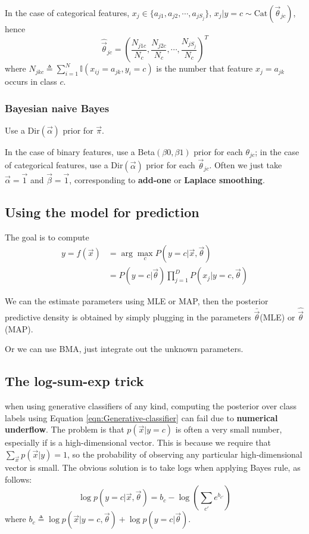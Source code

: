In the case of categorical features, $x_j \in \{a_{j1},a_{j2},\cdots, a_{jS_j}\}$, $x_j|y=c \sim \text{Cat}(\vec{\theta}_{jc})$, hence
\begin{equation}
\hat{\vec{\theta}}_{jc}=(\dfrac{N_{j1c}}{N_c},\dfrac{N_{j2c}}{N_c}, \cdots, \dfrac{N_{jS_j}}{N_c})^T
\end{equation}
where $N_{jkc} \triangleq \sum\limits_{i=1}^N \mathbb{I}(x_{ij}=a_{jk}, y_i=c)$ is the number that feature $x_j=a_{jk}$ occurs in class $c$.


\subsubsection{Bayesian naive Bayes}
\label{sec:Bayesian-naive-Bayes}
Use a Dir$(\vec{\alpha})$ prior for $\vec{\pi}$.

In the case of binary features, use a Beta$(\beta0,\beta1)$ prior for each $\theta_{jc}$; in the case of categorical features, use a Dir$(\vec{\alpha})$ prior for each  $\vec{\theta}_{jc}$. Often we just take $\vec{\alpha}=\vec{1}$ and $\vec{\beta}=\vec{1}$, corresponding to \textbf{add-one} or \textbf{Laplace smoothing}.


\subsection{Using the model for prediction}
The goal is to compute
\begin{equation}\begin{split}
y=f(\vec{x}) & =\arg\max\limits_{c}{P(y=c|\vec{x},\vec{\theta})} \\
   & =P(y=c|\vec{\theta})\prod_{j=1}^D P(x_j|y=c,\vec{\theta})
\end{split}\end{equation}

We can the estimate parameters using MLE or MAP, then the posterior predictive density is obtained by simply plugging in the parameters $\bar{\vec{\theta}}$(MLE) or $\hat{\vec{\theta}}$(MAP). 

Or we can use BMA, just integrate out the unknown parameters.


\subsection{The log-sum-exp trick}
when using generative classifiers of any kind, computing the posterior over class labels using Equation \ref{eqn:Generative-classifier} can fail due to \textbf{numerical underflow}. The problem is that $p(\vec{x}|y=c)$ is often a very small number, especially if  is a high-dimensional vector. This is because we require that $\sum_{\vec{x}}p(\vec{x}|y)=1$, so the probability of observing any particular high-dimensional vector is small. The obvious solution is to take logs when applying Bayes rule, as follows:
\begin{equation}
\log p(y=c|\vec{x},\vec{\theta})=b_c-\log\left(\sum\limits_{c'}e^{b_{c'}}\right)
\end{equation}
where $b_c \triangleq \log p(\vec{x}|y=c,\vec{\theta})+\log p(y=c|\vec{\theta})$.

